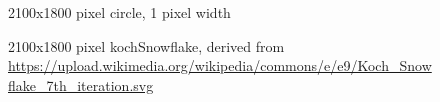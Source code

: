 \documentclass[12pt, oneside]{book}
\begin{document}
\begin{figure}[!b]
  \centering
  \caption[2100x1800 pixel circle]{2100x1800 pixel circle, 1 pixel width}
  \label{fig:circle_png}
\end{figure}

\begin{figure}[!b]
  \centering
  \caption[2100x1800 pixel kochSnowflake]{2100x1800 pixel kochSnowflake, derived from \url{https://upload.wikimedia.org/wikipedia/commons/e/e9/Koch_Snowflake_7th_iteration.svg}}
  \label{fig:kochSnowflake_png}
\end{figure}
\end{document}
